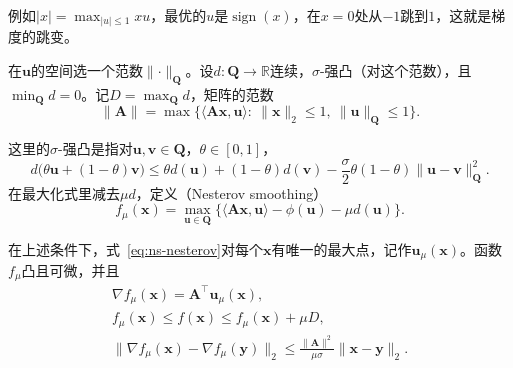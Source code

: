 例如$\lvert x\rvert=\max_{\lvert u\rvert\leq1}xu$，最优的$u$是$\operatorname{sign}(x)$，在$x=0$处从$-1$跳到$1$，这就是梯度的跳变。

在$\bm{u}$的空间选一个范数$\lVert\cdot\rVert_{\bm{Q}}$。设$d:\bm{Q}\to\mathbb{R}$连续，$\sigma$-强凸（对这个范数），且$\min_{\bm{Q}}d=0$。记$D=\max_{\bm{Q}}d$，矩阵的范数
\[
 \lVert\bm{A}\rVert=\max\bigl\{\langle\bm{A}\bm{x},\bm{u}\rangle:\ \lVert\bm{x}\rVert_2\leq1,\ \lVert\bm{u}\rVert_{\bm{Q}}\leq1\bigr\}.
\]

这里的$\sigma$-强凸是指对$\bm{u},\bm{v}\in\bm{Q}$，$\theta\in[0,1]$，
\begin{equation}
 d\bigl(\theta\bm{u}+(1-\theta)\bm{v}\bigr)\leq\theta d(\bm{u})+(1-\theta)d(\bm{v})-\frac{\sigma}{2}\theta(1-\theta)\lVert\bm{u}-\bm{v}\rVert_{\bm{Q}}^2.
 \label{eq:ns-sigma-strong}
\end{equation}
在最大化式里减去$\mu d$，定义（Nesterov smoothing）
\begin{equation}
 f_\mu(\bm{x})=\max_{\bm{u}\in\bm{Q}}\bigl\{\langle\bm{A}\bm{x},\bm{u}\rangle-\phi(\bm{u})-\mu d(\bm{u})\bigr\}.
 \label{eq:ns-nesterov}
\end{equation}

\begin{theorem}[Nesterov平滑的性质]
\label{thm:ns-nesterov}
在上述条件下，式~\eqref{eq:ns-nesterov}对每个$\bm{x}$有唯一的最大点，记作$\bm{u}_\mu(\bm{x})$。函数$f_\mu$凸且可微，并且
\begin{gather}
 \nabla f_\mu(\bm{x})=\bm{A}^\top\bm{u}_\mu(\bm{x}),\label{eq:ns-nesterov-grad}\\
 f_\mu(\bm{x})\leq f(\bm{x})\leq f_\mu(\bm{x})+\mu D,\label{eq:ns-nesterov-gap}\\
 \lVert\nabla f_\mu(\bm{x})-\nabla f_\mu(\bm{y})\rVert_2\leq\frac{\lVert\bm{A}\rVert^2}{\mu\sigma}\lVert\bm{x}-\bm{y}\rVert_2.\label{eq:ns-nesterov-lip}
\end{gather}
\end{theorem}

